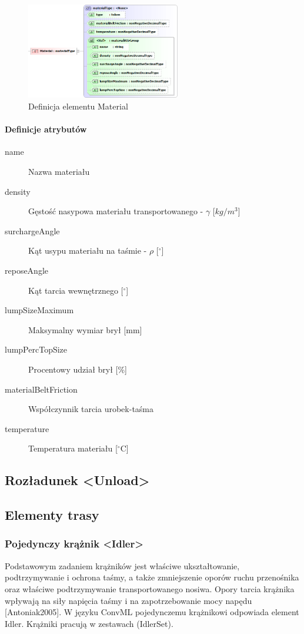 \documentclass[12pt,a4paper]{article}
\begin{document}
\begin{figure}[H]
  \centering
  \includegraphics[width=0.6\textwidth]{png/liquid/Material}
  \caption{Definicja elementu Material}
  \label{fig:material-xsd}
\end{figure}

\paragraph{Definicje atrybutów}
\begin{description}
\item[name] Nazwa materiału
\item[density] Gęstość nasypowa materiału transportowanego - $\gamma$ [$kg/m^3$]
\item[surchargeAngle] Kąt usypu materiału na taśmie - $\rho$ [$^\circ$]
\item[reposeAngle] Kąt tarcia wewnętrznego [$^\circ$]
\item[lumpSizeMaximum] Maksymalny wymiar brył [mm]
\item[lumpPercTopSize] Procentowy udział brył [\%]
\item[materialBeltFriction] Współczynnik tarcia urobek-taśma
\item[temperature] Temperatura materiału [$^\circ$C]
\end{description}


\subsection{Rozładunek <Unload>}


\subsection{Elementy trasy}


\subsubsection{Pojedynczy krążnik <Idler>}
Podstawowym zadaniem krążników jest właściwe ukształtowanie, podtrzymywanie i
ochrona taśmy, a także zmniejszenie oporów ruchu przenośnika oraz właściwe
podtrzymywanie transportowanego nosiwa.  Opory tarcia krążnika wpływają na siły
napięcia taśmy i na zapotrzebowanie mocy napędu [Antoniak2005].  W języku ConvML
pojedynczemu krążnikowi odpowiada element Idler. Krążniki pracują w zestawach
(IdlerSet).
\end{document}
